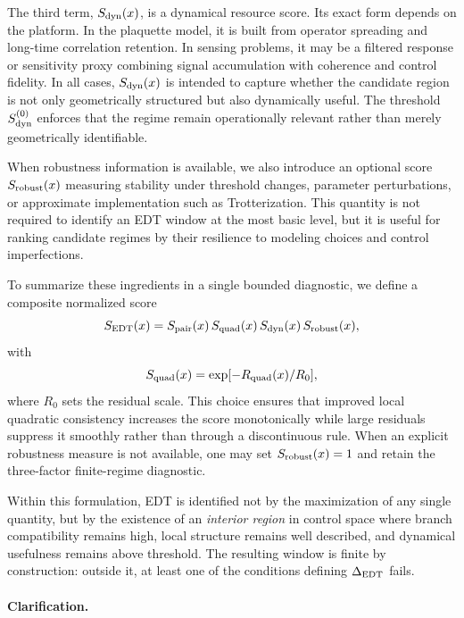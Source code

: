 The third term, $S_{\rm dyn}(x)$, is a dynamical resource score. Its exact form depends on the platform. In the plaquette model, it is built from operator spreading and long-time correlation retention. In sensing problems, it may be a filtered response or sensitivity proxy combining signal accumulation with coherence and control fidelity. In all cases, $S_{\rm dyn}(x)$ is intended to capture whether the candidate region is not only geometrically structured but also dynamically useful. The threshold $S_{\rm dyn}^{(0)}$ enforces that the regime remain operationally relevant rather than merely geometrically identifiable.

When robustness information is available, we also introduce an optional score $S_{\rm robust}(x)$ measuring stability under threshold changes, parameter perturbations, or approximate implementation such as Trotterization. This quantity is not required to identify an EDT window at the most basic level, but it is useful for ranking candidate regimes by their resilience to modeling choices and control imperfections.

To summarize these ingredients in a single bounded diagnostic, we define a composite normalized score
\begin{equation}
S_{\rm EDT}(x) = S_{\rm pair}(x)\,S_{\rm quad}(x)\,S_{\rm dyn}(x)\,S_{\rm robust}(x),
\end{equation}
with
\begin{equation}
S_{\rm quad}(x) = \exp[-R_{\rm quad}(x)/R_0],
\end{equation}
where $R_0$ sets the residual scale. This choice ensures that improved local quadratic consistency increases the score monotonically while large residuals suppress it smoothly rather than through a discontinuous rule. When an explicit robustness measure is not available, one may set $S_{\rm robust}(x)=1$ and retain the three-factor finite-regime diagnostic.

Within this formulation, EDT is identified not by the maximization of any single quantity, but by the existence of an \emph{interior region} in control space where branch compatibility remains high, local structure remains well described, and dynamical usefulness remains above threshold. The resulting window is finite by construction: outside it, at least one of the conditions defining $\Delta_{\rm EDT}$ fails.

\paragraph*{Clarification.}

